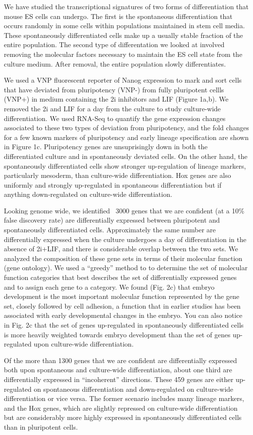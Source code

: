 
We have studied the transcriptional signatures of two forms of differentiation that mouse ES cells can undergo. The first is the spontaneous differentiation that occurs randomly in some cells within populations maintained in stem cell media. These spontaneously differentiated cells make up a usually stable fraction of the entire population. The second type of differentation we looked at involved removing the molecular factors necessary to maintain the ES cell state from the culture medium. After removal, the entire population slowly differentiates.

We used a VNP fluorescent reporter of Nanog expression to mark and sort cells that have deviated from pluripotency (VNP-) from fully pluripotent cellls (VNP+) in medium containing the 2i inhibitors and LIF (Figure 1a,b). We removed the 2i and LIF for a day from the culture to study culture-wide differentiation. We used RNA-Seq to quantify the gene expression changes associated to these two types of deviation from pluripotency, and the fold changes for a few known markers of pluripotency and early lineage specification are shown in Figure 1c. Pluripotency genes are unsuprisingly down in both the differentiated culture and in spontaneously deviated cells. On the other hand, the spontaneously differentiated cells show stronger up-regulation of lineage markers, particularly mesoderm, than culture-wide differentiation. Hox genes are also uniformly and strongly up-regulated in spontaneous differentiation but if anything down-regulated on culture-wide differentiation.

Looking genome wide, we identified ~3000 genes that we are confident (at a 10\% false discovery rate) are differentially expressed between pluripotent and spontaneously differentiated cells. Approximately the same number are differentially expressed when the culture undergoes a day of differentiation in the absence of 2i+LIF, and there is considerable overlap between the two sets. We analyzed the composition of these gene sets in terms of their molecular function (gene ontology). We used a ``greedy'' method to to determine the set of molecular function categories that best describes the set of differentially expressed genes and to assign each gene to a category. We found (Fig. 2c) that embryo development is the most important molecular function represented by the gene set, closely followed by cell adhesion, a function that in earlier studies has been associated with early developmental changes in the embryo. You can also notice in Fig. 2c that the set of genes up-regulated in spontaneously differentiated cells is more heavily weighted towards embryo development than the set of genes up-regulated upon culture-wide differentiation. 

Of the more than 1300 genes that we are confident are differentially expressed both upon spontaneous and culture-wide differentiation, about one third are differentially expressed in ``incoherent'' directions. These 459 genes are either up-regulated on spontaneous differentiation and down-regulated on culture-wide differentiation or vice versa. The former scenario includes many lineage markers, and the Hox genes, which are slightly repressed on culture-wide differentiation but are considerably more highly expressed in spontaneously differentiated cells than in pluripotent cells. 